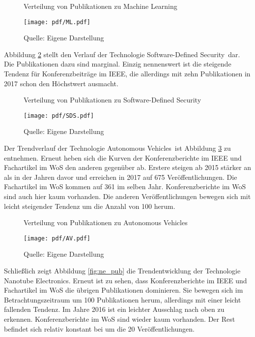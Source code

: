 \begin{figure}
	\centering
	\caption{Verteilung von Publikationen zu \glqq Machine Learning\grqq}
	\texttt{[image: pdf/ML.pdf]}
	\caption*{Quelle: Eigene Darstellung}
	\label{fig:ml_pub}
\end{figure}

Abbildung \ref{fig:sds_pub} stellt den Verlauf der Technologie \glqq Software-Defined Security\grqq~dar. Die Publikationen dazu sind marginal. Einzig nennenswert ist die steigende Tendenz für Konferenzbeiträge im \ac{IEEE}, die allerdings mit zehn Publikationen in 2017 schon den Höchstwert ausmacht.

\begin{figure}
	\centering
	\caption{Verteilung von Publikationen zu \glqq Software-Defined Security\grqq}
	\texttt{[image: pdf/SDS.pdf]}
	\caption*{Quelle: Eigene Darstellung}
	\label{fig:sds_pub}
\end{figure}

Der Trendverlauf der Technologie \glqq Autonomous Vehicles\grqq~ist Abbildung \ref{fig:av_pub} zu entnehmen. Erneut heben sich die Kurven der Konferenzberichte im \ac{IEEE} und Fachartikel im \ac{WoS} den anderen gegenüber ab. Erstere steigen ab 2015 stärker an als in der Jahren davor und erreichen in 2017 auf 675 Veröffentlichungen. Die Fachartikel im \ac{WoS} kommen auf 361 im selben Jahr. Konferenzberichte im \ac{WoS} sind auch hier kaum vorhanden. Die anderen Veröffentlichungen bewegen sich mit leicht steigender Tendenz um die Anzahl von 100 herum.

\begin{figure}
	\centering
	\caption{Verteilung von Publikationen zu \glqq Autonomous Vehicles\grqq}
	\texttt{[image: pdf/AV.pdf]}
	\caption*{Quelle: Eigene Darstellung}
	\label{fig:av_pub}
\end{figure}

Schließlich zeigt Abbildung \ref{fig:ne_pub} die Trendentwicklung der Technologie \glqq Nanotube Electronics\grqq. Erneut ist zu sehen, dass Konferenzberichte im \ac{IEEE} und Fachartikel im \ac{WoS} die übrigen Publikationen dominieren. Sie bewegen sich im Betrachtungszeitraum um 100 Publikationen herum, allerdings mit einer leicht fallenden Tendenz. Im Jahre 2016 ist ein leichter Ausschlag nach oben zu erkennen. Konferenzberichte im \ac{WoS} sind wieder kaum vorhanden. Der Rest befindet sich relativ konstant bei um die 20 Veröffentlichungen.

